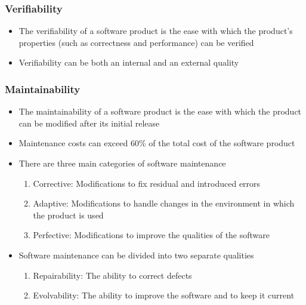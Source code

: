 \documentclass[t,12pt,numbers,fleqn]{beamer}
\begin{document}

\begin{frame}
\frametitle{Verifiability}

\begin{itemize}
\item The verifiability of a software product is the ease with which the
  product's properties (such as correctness and performance) can be verified
\item Verifiability can be both an internal and an external quality
\end{itemize}

\end{frame}


\begin{frame}
\frametitle{Maintainability}

\begin{itemize}
\item The maintainability of a software product is the ease with which the
  product can be modified after its initial release
\item Maintenance costs can exceed 60\% of the total cost of the software product
\item There are three main categories of software maintenance
\begin{enumerate}
\item Corrective: Modifications to fix residual and introduced errors
\item Adaptive: Modifications to handle changes in the environment in which the product is used
\item Perfective: Modifications to improve the qualities of the software
\end{enumerate}
\item Software maintenance can be divided into two separate qualities
\begin{enumerate}
\item Repairability: The ability to correct defects
\item Evolvability: The ability to improve the software and to keep it current
\end{enumerate}
\end{itemize}

\end{frame}
\end{document}

